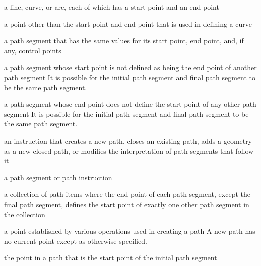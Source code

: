 
a line, \bezierlocal curve, or arc, each of which has a start point and an end point

a point other than the start point and end point that is used in defining a \bezierlocal curve

a path segment that has the same values for its start point, end point, and, if any, control points

a path segment whose start point is not defined as being the end point of another path segment
\enternote
It is possible for the initial path segment and final path segment to be the same path segment.
\exitnote

a path segment whose end point does not define the start point of any other path segment
\enternote
It is possible for the initial path segment and final path segment to be the same path segment.
\exitnote

an instruction that creates a new path, closes an existing path, adds a geometry as a new closed path, or modifies the interpretation of path segments that follow it

a path segment or path instruction

a collection of path items where the end point of each path segment, except the final path segment, defines the start point of exactly one other path segment in the collection

a point established by various operations used in creating a path
\enternote
A new path has no current point except as otherwise specified.
\exitnote

the point in a path that is the start point of the initial path segment

